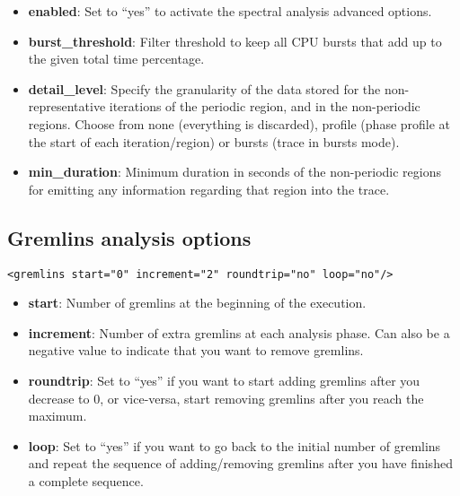 \begin{itemize}
 \item \textbf{enabled}: Set to ``yes'' to activate the spectral analysis advanced options.
 \item \textbf{burst\_threshold}: Filter threshold to keep all CPU bursts that add up to the given total time percentage.
 \item \textbf{detail\_level}: Specify the granularity of the data stored for the non-representative iterations of the 
 periodic region, and in the non-periodic regions. Choose from none (everything is discarded), 
 profile (phase profile at the start of each iteration/region) or bursts (trace in bursts mode).
 \item \textbf{min\_duration}: Minimum duration in seconds of the non-periodic regions for emitting any information 
 regarding that region into the trace. 
\end{itemize}
           
\subsection{Gremlins analysis options}

\begin{verbatim}
<gremlins start="0" increment="2" roundtrip="no" loop="no"/>
\end{verbatim}

\begin{itemize} 
 \item \textbf{start}: Number of gremlins at the beginning of the execution.
 \item \textbf{increment}: Number of extra gremlins at each analysis phase. Can also be a negative value to indicate that
 you want to remove gremlins.
 \item \textbf{roundtrip}: Set to ``yes'' if you want to start adding gremlins after 
 you decrease to 0, or vice-versa, start removing gremlins after you reach the maximum.
 \item \textbf{loop}: Set to ``yes'' if you want to go back to the initial number 
 of gremlins and repeat the sequence of adding/removing gremlins after you have finished a complete sequence.
\end{itemize}
        



